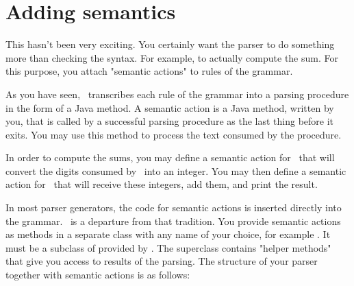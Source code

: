 
\section{Adding semantics}


This hasn't been very exciting.
You certainly want the parser to do something more than checking the syntax.
For example, to actually compute the sum.
For this purpose, you attach "semantic actions" to rules of the grammar.

As you have seen, \Mouse\ transcribes each rule of the grammar into a parsing procedure
in the form of a Java method.
A semantic action is a Java method, written by you,
that is called by a successful parsing procedure as the last thing before it exits.
You may use this method to process the text consumed by the procedure.

In order to compute the sums, you may define a semantic action for \Number\
that will convert the digits consumed by \Number\ into an integer.
You may then define a semantic action for \Sum\ that will receive these integers,
add them, and print the result.

In most parser generators, the code for semantic actions
is inserted directly into the grammar.
\Mouse\ is a departure from that tradition.
You provide semantic actions as methods in a separate class
with any name of your choice,
for example .
It must be a subclass of 
provided by \Mouse.
The superclass  contains "helper methods"
that give you access to results of the parsing.
The structure of your parser together with semantic actions is as follows:

